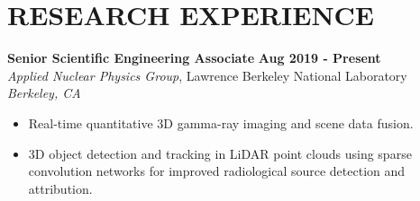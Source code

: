 \section{\small{RESEARCH EXPERIENCE}}

\textbf{Senior Scientific Engineering Associate} \hfill \textbf{Aug 2019 - Present} \\
\textsl{Applied Nuclear Physics Group}, Lawrence Berkeley National Laboratory \hfill \textsl{Berkeley, CA} \\[-2.8ex]
\vspace{2pt}
\begin{itemize}[leftmargin=4ex] \itemsep -2pt
    \item Real-time quantitative 3D gamma-ray imaging and scene data fusion.
    \item 3D object detection and tracking in LiDAR point clouds using sparse convolution networks for improved radiological source detection and attribution.
\end{itemize}

